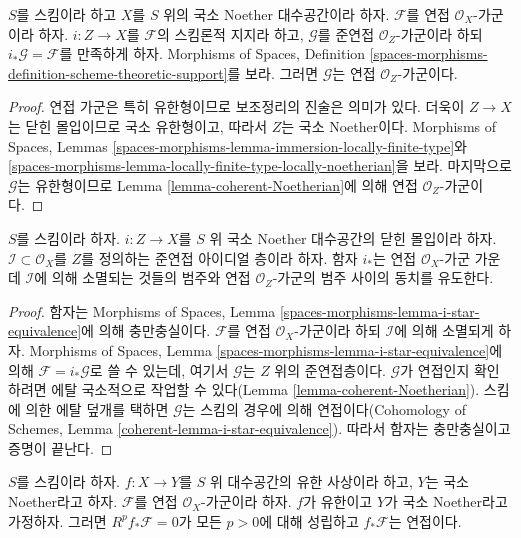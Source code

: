 \begin{lemma}
\label{lemma-coherent-support-closed}
$S$를 스킴이라 하고 $X$를 $S$ 위의 국소 Noether 대수공간이라 하자.
$\mathcal{F}$를 연접 $\mathcal{O}_X$-가군이라 하자.
$i : Z \to X$를 $\mathcal{F}$의 스킴론적 지지라 하고,
$\mathcal{G}$를 준연접 $\mathcal{O}_Z$-가군이라 하되
$i_*\mathcal{G} = \mathcal{F}$를 만족하게 하자. Morphisms of Spaces, Definition
\ref{spaces-morphisms-definition-scheme-theoretic-support}를 보라.
그러면 $\mathcal{G}$는 연접 $\mathcal{O}_Z$-가군이다.
\end{lemma}

\begin{proof}
연접 가군은 특히 유한형이므로 보조정리의 진술은 의미가 있다.
더욱이 $Z \to X$는 닫힌 몰입이므로 국소 유한형이고, 따라서 $Z$는
국소 Noether이다. Morphisms of Spaces, Lemmas
\ref{spaces-morphisms-lemma-immersion-locally-finite-type}와
\ref{spaces-morphisms-lemma-locally-finite-type-locally-noetherian}을 보라.
마지막으로 $\mathcal{G}$는 유한형이므로 Lemma
\ref{lemma-coherent-Noetherian}에 의해 연접 $\mathcal{O}_Z$-가군이다.
\end{proof}

\begin{lemma}
\label{lemma-i-star-equivalence}
$S$를 스킴이라 하자. $i : Z \to X$를 $S$ 위 국소 Noether
대수공간의 닫힌 몰입이라 하자. $\mathcal{I} \subset \mathcal{O}_X$를
$Z$를 정의하는 준연접 아이디얼 층이라 하자. 함자 $i_*$는
연접 $\mathcal{O}_X$-가군 가운데 $\mathcal{I}$에 의해 소멸되는 것들의 범주와
연접 $\mathcal{O}_Z$-가군의 범주 사이의 동치를 유도한다.
\end{lemma}

\begin{proof}
함자는 Morphisms of Spaces, Lemma
\ref{spaces-morphisms-lemma-i-star-equivalence}에 의해 충만충실이다.
$\mathcal{F}$를 연접 $\mathcal{O}_X$-가군이라 하되 $\mathcal{I}$에 의해
소멸되게 하자. Morphisms of Spaces, Lemma
\ref{spaces-morphisms-lemma-i-star-equivalence}에 의해
$\mathcal{F} = i_*\mathcal{G}$로 쓸 수 있는데, 여기서 $\mathcal{G}$는
$Z$ 위의 준연접층이다. $\mathcal{G}$가 연접인지
확인하려면 에탈 국소적으로 작업할 수 있다(Lemma
\ref{lemma-coherent-Noetherian}). 스킴에 의한 에탈 덮개를 택하면
$\mathcal{G}$는 스킴의 경우에 의해 연접이다(Cohomology of Schemes,
Lemma \ref{coherent-lemma-i-star-equivalence}). 따라서 함자는
충만충실이고 증명이 끝난다.
\end{proof}

\begin{lemma}
\label{lemma-finite-pushforward-coherent}
$S$를 스킴이라 하자. $f : X \to Y$를 $S$ 위 대수공간의 유한
사상이라 하고, $Y$는 국소 Noether라고 하자. $\mathcal{F}$를 연접
$\mathcal{O}_X$-가군이라 하자.
$f$가 유한이고 $Y$가 국소 Noether라고 가정하자. 그러면
$R^pf_*\mathcal{F} = 0$가 모든 $p > 0$에 대해 성립하고
$f_*\mathcal{F}$는 연접이다.
\end{lemma}

